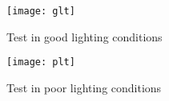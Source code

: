 \newpage

\begin{figure}[!htbp]
    \centering
    \texttt{[image: glt]}
    \caption{
        Test in good lighting conditions
    }\label{fig:glt}
\end{figure}

\begin{figure}[!htpb]
    \centering
    \texttt{[image: plt]}
    \caption{
        Test in poor lighting conditions
    }\label{fig:plt}
\end{figure}
\newpage